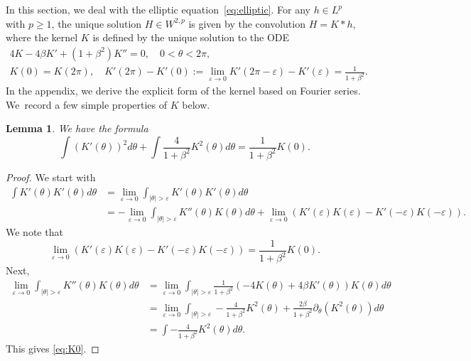 \documentclass[10pt]{amsart}
\let\epsilon\varepsilon
\theoremstyle{plain}
\newtheorem{lemma}[theorem]{Lemma}
\theoremstyle{definition}
\let\rd\partial
\let\bt\beta
\let\tht\theta
\begin{document}
In this section, we deal with the elliptic equation~\eqref{eq:elliptic}. For any $h \in L^p$ with $p\ge1$, the unique solution $H \in W^{2,p}$ is given by the convolution $H=K*h$, where the kernel $K$ is defined by the unique solution to the ODE
\begin{equation}\label{eq:K}
\begin{split}
4K - 4\bt K' + (1+\bt^2)K'' = 0, \quad 0<\tht<2\pi, \\
K(0) = K(2\pi), \quad K'(2\pi)-K'(0) := \lim_{\epsilon\to 0}K'(2\pi-\epsilon)-K'(\epsilon)=\frac{1}{1+\beta^2}.
\end{split}
\end{equation}
In the appendix, we derive the explicit form of the kernel based on Fourier series. We~record a few simple properties of $K$ below.
\begin{lemma} We have the formula
\begin{equation}\label{eq:K0}
\int (K'(\tht))^2 d\tht + \int \frac{4}{1+\bt^2} K^2(\tht) d\tht = \frac{1}{1+\bt^2}K(0).
\end{equation}
\end{lemma}
\begin{proof} We start with
\begin{equation*}
\begin{split}
\int K'(\tht)K'(\tht) d\tht &= \lim_{\varepsilon\to0} \int_{ |\tht |>\varepsilon} K'(\tht)K'(\tht) d\tht \\
& = - \lim_{\varepsilon\to0} \int_{ |\tht |>\varepsilon} K''(\tht)K(\tht) d\tht + \lim_{\varepsilon\to0} (K'(\varepsilon)K(\varepsilon) - K'(-\varepsilon)K(-\varepsilon)).
\end{split}
\end{equation*}
We note that\vspace*{-3pt}
\begin{equation*}
\lim_{\varepsilon\to0} (K'(\varepsilon)K(\varepsilon) - K'(-\varepsilon)K(-\varepsilon)) = \frac{1}{1+\bt^2}K(0).
\end{equation*}
Next,\vspace*{-3pt}
\begin{equation*}
\begin{split}
\lim_{\varepsilon\to0} \int_{ |\tht |>\varepsilon} K''(\tht)K(\tht) d\tht &= \lim_{\varepsilon\to0} \int_{ |\tht |>\varepsilon} \frac{1}{1+\bt^2} \left(-4K(\tht) + 4\bt K'(\tht) \right)K(\tht) d\tht \\
& = \lim_{\varepsilon\to0} \int_{ |\tht |>\varepsilon} -\frac{4}{1+\bt^2} K^2(\tht) + \frac{2\bt}{1+\bt^2} \rd_\tht (K^2(\tht)) d\tht\\
&= \int -\frac{4}{1+\bt^2} K^2(\tht) d\tht.
\end{split}
\end{equation*}
This gives \eqref{eq:K0}.
\end{proof}
\end{document}
